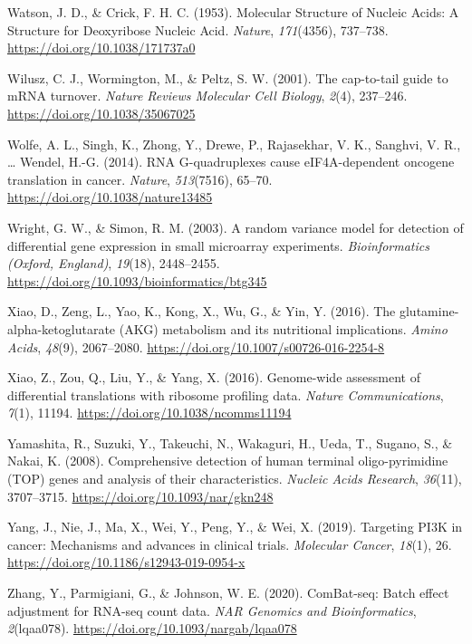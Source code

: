 \documentclass[12pt,openany]{book}
\begin{document}
\hypertarget{ref-Watson1953}{}
Watson, J. D., \& Crick, F. H. C. (1953). Molecular Structure of Nucleic
Acids: A Structure for Deoxyribose Nucleic Acid. \emph{Nature},
\emph{171}(4356), 737--738. \url{https://doi.org/10.1038/171737a0}

\hypertarget{ref-Wilusz2001}{}
Wilusz, C. J., Wormington, M., \& Peltz, S. W. (2001). The cap-to-tail
guide to mRNA turnover. \emph{Nature Reviews Molecular Cell Biology},
\emph{2}(4), 237--246. \url{https://doi.org/10.1038/35067025}

\hypertarget{ref-Wolfe2014}{}
Wolfe, A. L., Singh, K., Zhong, Y., Drewe, P., Rajasekhar, V. K.,
Sanghvi, V. R., \ldots{} Wendel, H.-G. (2014). RNA G-quadruplexes cause
eIF4A-dependent oncogene translation in cancer. \emph{Nature},
\emph{513}(7516), 65--70. \url{https://doi.org/10.1038/nature13485}

\hypertarget{ref-Wright2003}{}
Wright, G. W., \& Simon, R. M. (2003). A random variance model for
detection of differential gene expression in small microarray
experiments. \emph{Bioinformatics (Oxford, England)}, \emph{19}(18),
2448--2455. \url{https://doi.org/10.1093/bioinformatics/btg345}

\hypertarget{ref-Xiao2016a}{}
Xiao, D., Zeng, L., Yao, K., Kong, X., Wu, G., \& Yin, Y. (2016). The
glutamine-alpha-ketoglutarate (AKG) metabolism and its nutritional
implications. \emph{Amino Acids}, \emph{48}(9), 2067--2080.
\url{https://doi.org/10.1007/s00726-016-2254-8}

\hypertarget{ref-Xiao2016}{}
Xiao, Z., Zou, Q., Liu, Y., \& Yang, X. (2016). Genome-wide assessment
of differential translations with ribosome profiling data. \emph{Nature
Communications}, \emph{7}(1), 11194.
\url{https://doi.org/10.1038/ncomms11194}

\hypertarget{ref-Yamashita2008}{}
Yamashita, R., Suzuki, Y., Takeuchi, N., Wakaguri, H., Ueda, T., Sugano,
S., \& Nakai, K. (2008). Comprehensive detection of human terminal
oligo-pyrimidine (TOP) genes and analysis of their characteristics.
\emph{Nucleic Acids Research}, \emph{36}(11), 3707--3715.
\url{https://doi.org/10.1093/nar/gkn248}

\hypertarget{ref-Yang2019}{}
Yang, J., Nie, J., Ma, X., Wei, Y., Peng, Y., \& Wei, X. (2019).
Targeting PI3K in cancer: Mechanisms and advances in clinical trials.
\emph{Molecular Cancer}, \emph{18}(1), 26.
\url{https://doi.org/10.1186/s12943-019-0954-x}

\hypertarget{ref-Zhang2020}{}
Zhang, Y., Parmigiani, G., \& Johnson, W. E. (2020). ComBat-seq: Batch
effect adjustment for RNA-seq count data. \emph{NAR Genomics and
Bioinformatics}, \emph{2}(lqaa078).
\url{https://doi.org/10.1093/nargab/lqaa078}
\end{document}
